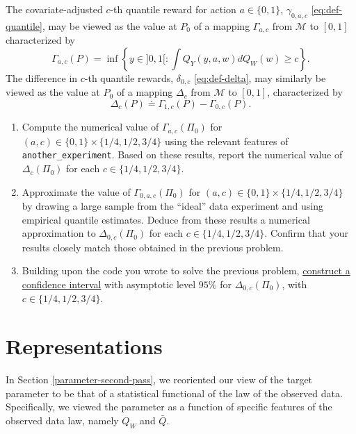 \documentclass[
  11pt,
  openright,twoside]{book}
\newcommand{\defq}{\doteq}
\newcommand{\calM}{\mathcal{M}}
\newcommand{\Qbar}{\bar{Q}}
\theoremstyle{definition}
\theoremstyle{definition}
\theoremstyle{definition}
\theoremstyle{definition}
\theoremstyle{remark}
\begin{document}
The covariate-adjusted \(c\)-th quantile reward for action \(a \in \{0,1\}\),
\(\gamma_{0,a,c}\) \eqref{eq:def-quantile}, may be viewed as the value at \(P_{0}\)
of a mapping \(\Gamma_{a,c}\) from \(\calM\) to \([0,1]\) characterized by
\begin{equation*} \Gamma_{a,c}(P) = \inf\left\{y \in ]0,1[ : \int Q_{Y}(y,a,w)
dQ_W(w) \ge  c \right\}.   \end{equation*} The difference in \(c\)-th quantile
rewards, \(\delta_{0,c}\) \eqref{eq:def-delta}, may similarly be viewed as the
value at \(P_{0}\) of a mapping \(\Delta_c\) from \(\calM\) to \([0,1]\),
characterized by \begin{equation*}   \Delta_c(P)  \defq  \Gamma_{1,c}(P)  -
\Gamma_{0,c}(P).  \end{equation*}

\begin{enumerate}
\def\labelenumi{\arabic{enumi}.}
\item
  Compute the numerical value of \(\Gamma_{a,c}(\Pi_0)\) for \((a,c) \in \{0,1\} \times \{1/4, 1/2, 3/4\}\) using the relevant features of
  \texttt{another\_experiment}. Based on these results, report the numerical value
  of \(\Delta_c(\Pi_0)\) for each \(c \in \{1/4, 1/2, 3/4\}\).
\item
  Approximate the value of \(\Gamma_{0,a,c}(\Pi_{0})\) for \((a,c) \in \{0,1\} \times \{1/4, 1/2, 3/4\}\) by drawing a large sample from the ``ideal'' data
  experiment and using empirical quantile estimates. Deduce from these
  results a numerical approximation to \(\Delta_{0,c} (\Pi_{0})\) for each \(c \in \{1/4, 1/2, 3/4\}\). Confirm that your results closely match those
  obtained in the previous problem.
\item
  Building upon the code you wrote to solve the previous problem, \protect\hyperlink{order}{construct
  a confidence interval} with asymptotic level
  \(95\%\) for \(\Delta_{0,c} (\Pi_{0})\), with \(c \in \{1/4, 1/2, 3/4\}\).
\end{enumerate}

\hypertarget{parameter-third-pass}{%
\section{Representations}\label{parameter-third-pass}}

In Section \ref{parameter-second-pass}, we reoriented our view of the target
parameter to be that of a statistical functional of the law of the observed
data. Specifically, we viewed the parameter as a function of specific features
of the observed data law, namely \(Q_{W}\) and \(\Qbar\).
\end{document}
